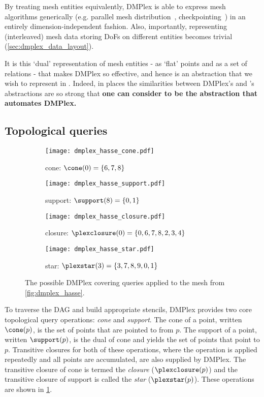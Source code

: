 \documentclass[thesis]{subfiles}
\begin{document}
By treating mesh entities equivalently, DMPlex is able to express mesh algorithms generically (e.g. parallel mesh distribution~\cite{knepleyUnstructuredOverlappingMesh2015}, checkpointing~\cite{hamEfficientNtoMCheckpointing2024}) in an entirely dimension-independent fashion.
Also, importantly, representing (interleaved) mesh data storing DoFs on different entities becomes trivial (\cref{sec:dmplex_data_layout}).

It is this `dual' representation of mesh entities - as `flat' points and as a set of relations - that makes DMPlex so effective, and hence is an abstraction that we wish to represent in .
Indeed, in places the similarities between DMPlex's and 's abstractions are so strong that \textbf{one can consider  to be the abstraction that automates DMPlex.}

\subsection{Topological queries}

\begin{figure}
  \centering
  \begin{subfigure}{.49\textwidth}
    \centering
    \texttt{[image: dmplex\_hasse\_cone.pdf]}
    \caption{cone: $\cone(0) = \{6,7,8\}$}
  \end{subfigure}
  \begin{subfigure}{.49\textwidth}
    \centering
    \texttt{[image: dmplex\_hasse\_support.pdf]}
    \caption{support: $\support(8) = \{0,1\}$}
  \end{subfigure}

  \vspace{1em}

  \begin{subfigure}{.49\textwidth}
    \centering
    \texttt{[image: dmplex\_hasse\_closure.pdf]}
    \caption{closure: $\plexclosure(0) = \{0,6,7,8,2,3,4\}$}
  \end{subfigure}
  \begin{subfigure}{.49\textwidth}
    \centering
    \texttt{[image: dmplex\_hasse\_star.pdf]}
    \caption{star: $\plexstar(3) = \{3,7,8,9,0,1\}$}
  \end{subfigure}

  \caption{
    The possible DMPlex covering queries applied to the mesh from \cref{fig:dmplex_hasse}.
  }
  \label{fig:dmplex_queries}
\end{figure}

To traverse the DAG and build appropriate stencils, DMPlex provides two core topological query operations: \emph{cone} and \emph{support}.
The cone of a point, written $\cone(p)$, is the set of points that are pointed to from $p$.
The support of a point, written $\support(p)$, is the dual of cone and yields the set of points that point to $p$.
Transitive closures for both of these operations, where the operation is applied repeatedly and all points are accumulated, are also supplied by DMPlex.
The transitive closure of cone is termed the \emph{closure} ($\plexclosure(p)$) and the transitive closure of support is called the \emph{star} ($\plexstar(p)$).
These operations are shown in \cref{fig:dmplex_queries}.
\end{document}

